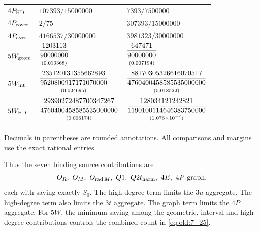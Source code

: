 \begin{longtable}{@{}p{}p{}p{}@{}}
$4P_{\rm HD}$ & $107393/15000000$ & $7393/7500000$\\
$4P_{\rm cover}$ & $2/75$ & $307393/15000000$\\
$4P_{\rm axes}$ & $4166537/30000000$ & $3981323/30000000$\\
$5W_{\rm geom}$ &
$\begin{gathered}\dfrac{1203113}{90000000}\\[-2pt]\text{\scriptsize (0.013368)}\end{gathered}$ &
$\begin{gathered}\dfrac{647471}{90000000}\\[-2pt]\text{\scriptsize (0.007194)}\end{gathered}$\\
$5W_{\rm int}$ &
$\begin{gathered}\dfrac{235120131355662893}{9520800917171070000}\\[-2pt]\text{\scriptsize (0.024695)}\end{gathered}$ &
$\begin{gathered}\dfrac{88170305326616070517}{4760400458585535000000}\\[-2pt]\text{\scriptsize (0.018522)}\end{gathered}$\\
$5W_{\rm HD}$ &
$\begin{gathered}\dfrac{29390272487700347267}{4760400458585535000000}\\[-2pt]\text{\scriptsize (0.006174)}\end{gathered}$ &
$\rule{0pt}{3.2ex}\begin{gathered}\dfrac{128034121242821}{1190100114646383750000}\\[-2pt]\text{\scriptsize (1.076\ensuremath{\times10^{-7}})}\end{gathered}$\\
\bottomrule
\end{longtable}
\normalsize

Decimals in parentheses are rounded annotations. All comparisons
and margins use the exact rational entries.

Thus the seven binding source contributions are
\[
O_R,\ O_M,\ O_{\operatorname{rad}M},\ Q1,\ Q2t_{\rm harm},\ 4E,\ 4P\text{ graph},
\]
each with saving exactly $S_0$. The high-degree term limits the $3u$
aggregate. The high-degree term also limits the $3t$ aggregate.
The graph term limits the $4P$ aggregate. For $5W$, the minimum
saving among the geometric, interval and high-degree contributions controls
the combined count in \eqref{eq:old:7_25}.

